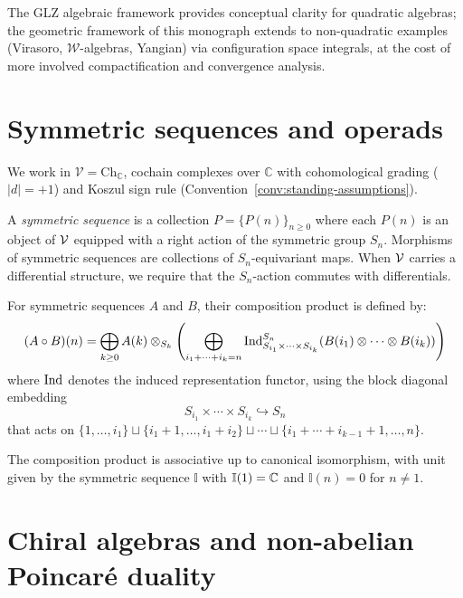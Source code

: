 \begin{remark}
\label{rem:advantages-comparison}
The GLZ algebraic framework provides conceptual clarity for quadratic
algebras; the geometric framework of this monograph extends to
non-quadratic examples (Virasoro, $\mathcal{W}$-algebras, Yangian)
via configuration space integrals, at the cost of more involved
compactification and convergence analysis.
\end{remark}

\section{Symmetric sequences and operads}

We work in $\mathcal{V} = \mathrm{Ch}_\mathbb{C}$, cochain complexes over $\mathbb{C}$ with cohomological grading ($|d| = +1$) and Koszul sign rule (Convention~\ref{conv:standing-assumptions}).

\begin{definition}
A \emph{symmetric sequence} is a collection $P = \{P(n)\}_{n \geq 0}$ where each $P(n)$ is an object of $\mathcal{V}$ equipped with a right action of the symmetric group $S_n$. Morphisms of symmetric sequences are collections of $S_n$-equivariant maps. When $\mathcal{V}$ carries a differential structure, we require that the $S_n$-action commutes with differentials.
\end{definition}
 
\begin{definition}
For symmetric sequences $A$ and $B$, their composition product is defined by:
\[
(A \circ B)(n) = \bigoplus_{k \geq 0} A(k) \otimes_{S_k} \left( \bigoplus_{i_1 + \cdots + i_k = n} \operatorname{Ind}_{S_{i_1} \times \cdots \times S_{i_k}}^{S_n}(B(i_1) \otimes \cdots \otimes B(i_k)) \right)
\]
where $\operatorname{Ind}$ denotes the induced representation functor, using the block diagonal embedding 
\[
S_{i_1} \times \cdots \times S_{i_k} \hookrightarrow S_n
\]
that acts on $\{1, \ldots, i_1\} \sqcup \{i_1 + 1, \ldots, i_1 + i_2\} \sqcup \cdots \sqcup \{i_1 + \cdots + i_{k-1} + 1, \ldots, n\}$.
\end{definition}
 
The composition product is associative up to canonical isomorphism, with unit given by the symmetric sequence $\mathbb{I}$ with $\mathbb{I}(1) = \mathbb{C}$ and $\mathbb{I}(n) = 0$ for $n \neq 1$.
 
\section{Chiral algebras and non-abelian Poincaré duality}
\label{sec:chiral-NAP}

